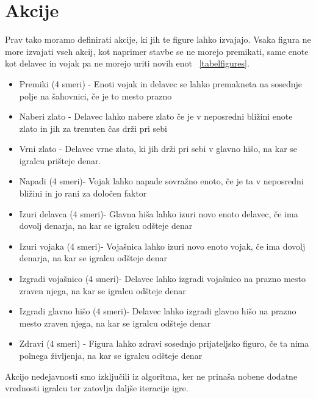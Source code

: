 \documentclass[a4paper, 12pt]{book}
\begin{document}
\section{Akcije}
Prav tako moramo definirati akcije, ki jih te figure lahko izvajajo. Vsaka figura ne more izvajati vseh akcij, kot naprimer stavbe se ne morejo premikati, same enote kot delavec in vojak pa ne morejo uriti novih enot ~\ref{tabelfigures}.

\begin{itemize}
	\item Premiki (4 smeri) - Enoti vojak in delavec se lahko premakneta na sosednje polje na šahovnici, če je to mesto prazno
	\item Naberi zlato - Delavec lahko nabere zlato če je v neposredni bližini enote zlato in jih za trenuten čas drži pri sebi 
	\item Vrni zlato - Delavec vrne zlato, ki jih drži pri sebi v glavno hišo, na kar se igralcu prišteje denar. 
	\item Napadi (4 smeri)- Vojak lahko napade sovražno enoto, če je ta v neposredni bližini in jo rani za določen faktor
	\item Izuri delavca (4 smeri)- Glavna hiša lahko izuri novo enoto delavec, če ima dovolj denarja, na kar se igralcu odšteje denar
	\item Izuri vojaka (4 smeri)- Vojašnica lahko izuri novo enoto vojak, če ima dovolj denarja, na kar se igralcu odšteje denar
	\item Izgradi vojašnico (4 smeri)- Delavec lahko izgradi vojašnico na prazno mesto zraven njega, na kar se igralcu odšteje denar
	\item Izgradi glavno hišo (4 smeri)- Delavec lahko izgradi glavno hišo na prazno mesto zraven njega, na kar se igralcu odšteje denar
	\item Zdravi (4 smeri) - Figura lahko zdravi sosednjo prijateljsko figuro, če ta nima polnega življenja, na kar se igralcu odšteje denar
\end{itemize}

Akcijo nedejavnosti smo izključili iz algoritma, ker ne prinaša nobene dodatne vrednosti igralcu ter zatovlja daljše iteracije igre.
\end{document}
